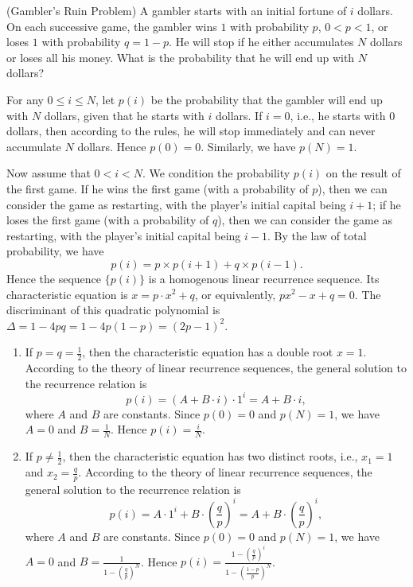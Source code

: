 \documentclass[12pt,letterpaper, onecolumn]{exam}
\begin{document}
\begin{questions}
\question[](Gambler's Ruin Problem) A gambler starts with an initial fortune of $i$ dollars. On each successive game, the gambler wins $1$ with probability $p$, $0<p<1$, or loses $1$ with probability $q=1-p$. He will stop if he either accumulates $N$ dollars or loses all his money. What is the probability that he will end up with $N$ dollars?
\begin{solution}
    For any $0\le i\le N$, let $p(i)$ be the probability that the gambler will end up with $N$ dollars, given that he starts with $i$ dollars. If $i=0$, i.e., he starts with $0$ dollars, then according to the rules, he will stop immediately and can never accumulate $N$ dollars. Hence $p(0)=0$. Similarly, we have $p(N)=1$. 
    
    \quad Now assume that $0<i<N$. We condition the probability $p(i)$ on the result of the first game. If he wins the first game (with a probability of $p$), then we can consider the game as restarting, with the player's initial capital being $i+1$; if he loses the first game (with a probability of $q$), then we can consider the game as restarting, with the player's initial capital being $i-1$. By the law of total probability, we have
    $$p(i)=p\times p(i+1)+q\times p(i-1).$$
    Hence the sequence $\{p(i)\}$ is a homogenous linear recurrence sequence. Its characteristic equation is $x=p\cdot x^2+q$, or equivalently, $px^2-x+q=0$. The discriminant of this quadratic polynomial is $\Delta=1-4pq=1-4p(1-p)=(2p-1)^2$.
    \begin{enumerate}
        \item If $p=q=\frac{1}{2}$, then the characteristic equation has a double root $x=1$. According to the theory of linear recurrence sequences, the general solution to the recurrence relation is 
        $$p(i)=(A+B\cdot i)\cdot 1^i=A+B\cdot i,$$ 
        where $A$ and $B$ are constants. Since $p(0)=0$ and $p(N)=1$, we have $A=0$ and $B=\frac{1}{N}$. Hence $p(i)=\frac{i}{N}$.
        \item If $p\ne\frac{1}{2}$, then the characteristic equation has two distinct roots, i.e., $x_1=1$ and $x_2=\frac{q}{p}$. According to the theory of linear recurrence sequences, the general solution to the recurrence relation is 
        $$p(i)=A\cdot 1^i+B\cdot\left(\frac{q}{p}\right)^i=A+B\cdot\left(\frac{q}{p}\right)^i,$$
        where $A$ and $B$ are constants. Since $p(0)=0$ and $p(N)=1$, we have $A=0$ and $B=\frac{1}{1-\left(\frac{q}{p}\right)^N}$. Hence $p(i)=\frac{1-\left(\frac{q}{p}\right)^i}{1-\left(\frac{1-p}{p}\right)^N}$.
    \end{enumerate}

\end{solution}
\end{questions}
\end{document}

